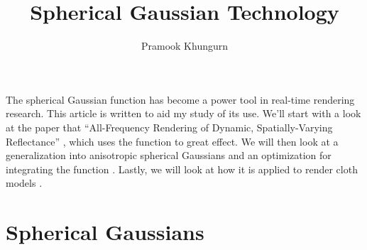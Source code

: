 \documentclass[10pt]{article}
\title{Spherical Gaussian Technology}
\author{Pramook Khungurn}
\begin{document}
  \maketitle

  The spherical Gaussian function has become a power tool in real-time rendering research.  This article is written to aid my study of its use.  We'll start with a look at the paper that ``All-Frequency Rendering of Dynamic, Spatially-Varying Reflectance'' \cite{Wang:2009}, which uses the function to great effect.  We will then look at a generalization into anisotropic spherical Gaussians \cite{Xu:2013} and an optimization for integrating the function \cite{Iwasaki:2012}.  Lastly, we will look at how it is applied to render cloth models \cite{Iwasaki:2014}.

  \section{Spherical Gaussians}
\end{document}
